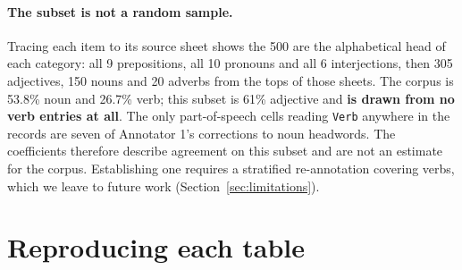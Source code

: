 \documentclass[11pt]{article}
\begin{document}
\paragraph{The subset is not a random sample.} Tracing each item to its source
sheet shows the 500 are the alphabetical head of each category: all 9
prepositions, all 10 pronouns and all 6 interjections, then 305 adjectives,
150 nouns and 20 adverbs from the tops of those sheets. The corpus is
53.8\% noun and 26.7\% verb; this subset is 61\% adjective and \textbf{is
drawn from no verb entries at all}. The only part-of-speech cells reading \texttt{Verb} anywhere
in the records are seven of Annotator 1's corrections to noun headwords. The
coefficients therefore describe agreement on this subset and are not an
estimate for the corpus. Establishing one requires a stratified
re-annotation covering verbs, which we leave to future work
(Section~\ref{sec:limitations}).

\section{Reproducing each table}
\label{app:repro}
\end{document}
